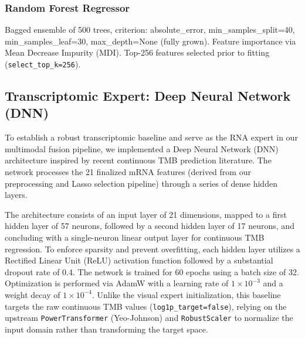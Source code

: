 \documentclass[11pt,a4paper]{article}
\begin{document}
\subsubsection{Random Forest Regressor}
Bagged ensemble of 500 trees, criterion: absolute\_error, min\_samples\_split=40, min\_samples\_leaf=30, max\_depth=None (fully grown). Feature importance via Mean Decrease Impurity (MDI). Top-256 features selected prior to fitting (\texttt{select\_top\_k=256}).

\subsection{Transcriptomic Expert: Deep Neural Network (DNN)}
To establish a robust transcriptomic baseline and serve as the RNA expert in our multimodal fusion pipeline, we implemented a Deep Neural Network (DNN) architecture inspired by recent continuous TMB prediction literature. The network processes the 21 finalized mRNA features (derived from our preprocessing and Lasso selection pipeline) through a series of dense hidden layers.

The architecture consists of an input layer of 21 dimensions, mapped to a first hidden layer of 57 neurons, followed by a second hidden layer of 17 neurons, and concluding with a single-neuron linear output layer for continuous TMB regression. To enforce sparsity and prevent overfitting, each hidden layer utilizes a Rectified Linear Unit (ReLU) activation function followed by a substantial dropout rate of 0.4. The network is trained for 60 epochs using a batch size of 32. Optimization is performed via AdamW with a learning rate of $1\times 10^{-3}$ and a weight decay of $1\times 10^{-4}$. Unlike the visual expert initialization, this baseline targets the raw continuous TMB values (\texttt{log1p\_target=false}), relying on the upstream \texttt{PowerTransformer} (Yeo-Johnson) and \texttt{RobustScaler} to normalize the input domain rather than transforming the target space.
\end{document}
